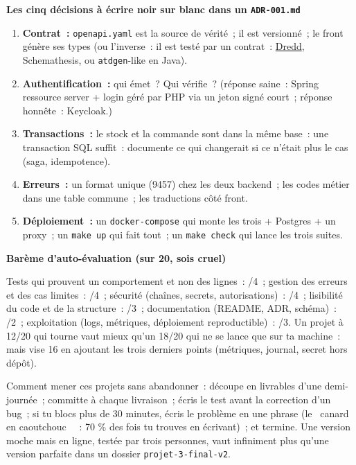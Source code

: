 \documentclass[12pt,a4paper,twoside,openright]{book}
\newcommand{\fichier}[1]{\texttt{\color{pathgreen}#1}}
\newcommand{\link}[2]{\href{#2}{#1}}
\newcommand{\etape}[1]{\par\medskip\noindent\textbf{\large #1}\par\smallskip}
\begin{document}
\etape{Les cinq d\'ecisions \`a \'ecrire noir sur blanc dans un \fichier{ADR-001.md}}
\begin{enumerate}
  \item \textbf{Contrat~:} \verb|openapi.yaml| est la source de v\'erit\'e~; il est versionn\'e~; le front
        g\'en\`ere ses types (ou l'inverse~: il est test\'e par un contrat~: \link{Dredd}{https://github.com/apiaryio/dredd},
        Schemathesis, ou \verb|atdgen|-like en Java).
  \item \textbf{Authentification~:} qui \'emet~? Qui v\'erifie~? (r\'eponse saine~: Spring ressource
        server + login g\'er\'e par PHP via un jeton sign\'e court~; r\'eponse honn\^ete~: Keycloak.)
  \item \textbf{Transactions~:} le stock et la commande sont dans la m\^eme base~: une transaction
        SQL suffit~: documente ce qui changerait si ce n'\'etait plus le cas (saga, idempotence).
  \item \textbf{Erreurs~:} un format unique (9457) chez les deux backend~; les codes m\'etier dans une
        table commune~; les traductions c\^ot\'e front.
  \item \textbf{D\'eploiement~:} un \verb|docker-compose| qui monte les trois + Postgres + un proxy~;
        un \verb|make up| qui fait tout~; un \verb|make check| qui lance les trois suites.
\end{enumerate}

\etape{Bar\`eme d'auto-\'evaluation (sur 20, sois cruel)}
Tests qui prouvent un comportement et non des lignes~: /4~; gestion des erreurs et des cas limites~:
/4~; s\'ecurit\'e (cha\^ines, secrets, autorisations)~: /4~; lisibilit\'e du code et de la structure~: /3~;
documentation (README, ADR, sch\'ema)~: /2~; exploitation (logs, m\'etriques, d\'eploiement reproductible)~: /3.
Un projet \`a 12/20 qui tourne vaut mieux qu'un 18/20 qui ne se lance que sur ta machine~: mais
vise 16 en ajoutant les trois derniers points (m\'etriques, journal, secret hors d\'ep\^ot).

\begin{note}
Comment mener ces projets sans abandonner~: d\'ecoupe en livrables d'une demi-journ\'ee~; committe \`a chaque
livraison~; \'ecris le test avant la correction d'un bug~; si tu blocs plus de
30 minutes, \'ecris le probl\`eme en une phrase (le \og ~canard en caoutchouc~ \fg{}~: 70 \% des fois tu
trouves en \'ecrivant)~; et termine. Une version moche mais en ligne, test\'ee par trois personnes,
vaut infiniment plus qu'une version parfaite dans un dossier \verb|projet-3-final-v2|.
\end{note}
\end{document}
